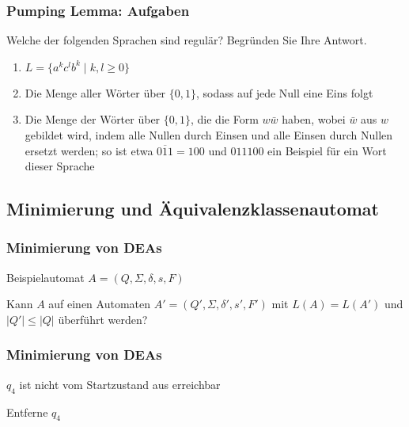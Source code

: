 \documentclass{beamer}
\begin{document}
{\begin{frame}
\end{frame}

\begin{frame}
\frametitle{Pumping Lemma: Aufgaben}
Welche der folgenden Sprachen sind regulär? Begründen Sie Ihre Antwort.

\begin{enumerate}
\item $L=\{a^kc^lb^k \mid k, l \geq 0 \}$
\item Die Menge aller Wörter über $\{0, 1\}$, sodass auf jede Null eine Eins folgt
\item Die Menge der Wörter über $\{0, 1\}$, die die Form $w\bar{w}$ haben, wobei $\bar{w}$ aus $w$ gebildet
wird, indem alle Nullen durch Einsen und alle Einsen durch Nullen ersetzt werden; so ist etwa 
$\overline{011}=100$ und $011100$ ein Beispiel für ein Wort dieser Sprache
\end{enumerate}

\end{frame}

\subsection{Minimierung und Äquivalenzklassenautomat}
\begin{frame}
 \frametitle{Minimierung von DEAs}
 \begin{block}{Beispielautomat \(A = (Q, \Sigma, \delta, s, F)\)}
 \begin{figure}[H]
\begin{center}
\end{center}
\end{figure}
\end{block}
Kann $A$ auf einen Automaten $A' = (Q', \Sigma, \delta', s', F')$ mit $L(A) = L(A')$ und $|Q'| \le |Q|$ überführt werden?
\end{frame}
\begin{frame}
\frametitle{Minimierung von DEAs}
$q_4$ ist nicht vom Startzustand aus erreichbar
\begin{block}{Entferne \(q_4\)}
 \begin{figure}[h]
\begin{center}
\end{center}
\end{figure}
\end{block}
\end{frame}}
\end{document}
